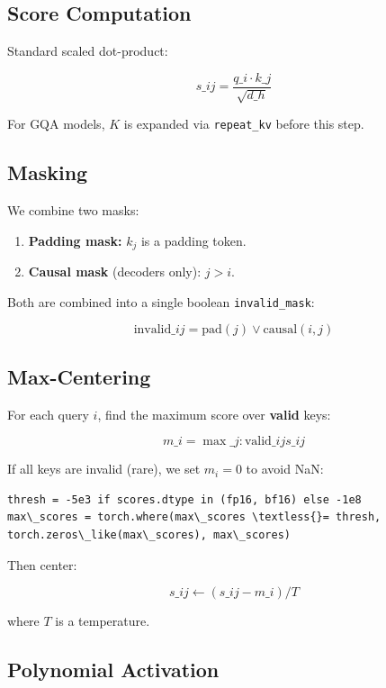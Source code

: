 \subsection{Score Computation}

Standard scaled dot-product:

\[
s\_{ij} = \frac{q\_i \cdot k\_j}{\sqrt{d\_h}}
\tag{4.1}
\]

For GQA models, $K$ is expanded via \texttt{repeat\_kv} before this step.

\subsection{Masking}

We combine two masks:

\begin{enumerate}
\item \textbf{Padding mask:} $k_j$ is a padding token.
\item \textbf{Causal mask} (decoders only): $j > i$.

\end{enumerate}
Both are combined into a single boolean \texttt{invalid\_mask}:

\[
\text{invalid}\_{ij} = \text{pad}(j) \lor \text{causal}(i, j)
\tag{4.2}
\]

\subsection{Max-Centering}

For each query $i$, find the maximum score over \textbf{valid} keys:

\[
m\_i = \max\_{j: \text{valid}\_{ij}} s\_{ij}
\tag{4.3}
\]

If all keys are invalid (rare), we set $m_i = 0$ to avoid NaN:

\begin{lstlisting}
thresh = -5e3 if scores.dtype in (fp16, bf16) else -1e8
max\_scores = torch.where(max\_scores \textless{}= thresh, torch.zeros\_like(max\_scores), max\_scores)
\end{lstlisting}

Then center:

\[
s\_{ij} \leftarrow (s\_{ij} - m\_i) / T
\tag{4.4}
\]

where $T$ is a temperature.

\subsection{Polynomial Activation}

